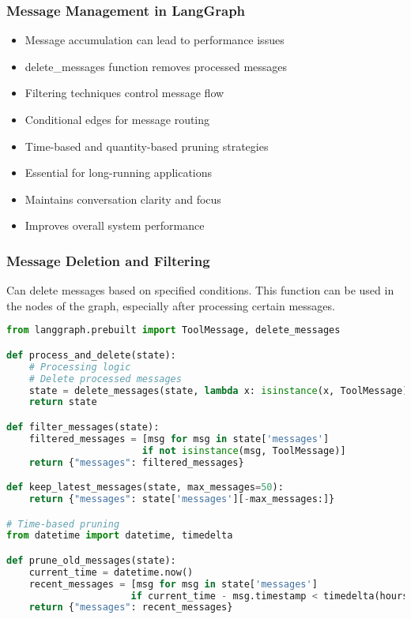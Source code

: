 \begin{frame}[fragile]\frametitle{Message Management in LangGraph}
      \begin{itemize}
        \item Message accumulation can lead to performance issues
        \item delete\_messages function removes processed messages
        \item Filtering techniques control message flow
        \item Conditional edges for message routing
        \item Time-based and quantity-based pruning strategies
        \item Essential for long-running applications
        \item Maintains conversation clarity and focus
        \item Improves overall system performance
      \end{itemize}
\end{frame}

\begin{frame}[fragile]\frametitle{Message Deletion and Filtering}

Can delete messages based on specified conditions. This function can be used in the nodes of the graph, especially after processing certain messages.

      \begin{lstlisting}[language=Python, basicstyle=\tiny]
from langgraph.prebuilt import ToolMessage, delete_messages

def process_and_delete(state):
    # Processing logic
    # Delete processed messages
    state = delete_messages(state, lambda x: isinstance(x, ToolMessage))
    return state

def filter_messages(state):
    filtered_messages = [msg for msg in state['messages'] 
                        if not isinstance(msg, ToolMessage)]
    return {"messages": filtered_messages}

def keep_latest_messages(state, max_messages=50):
    return {"messages": state['messages'][-max_messages:]}

# Time-based pruning
from datetime import datetime, timedelta

def prune_old_messages(state):
    current_time = datetime.now()
    recent_messages = [msg for msg in state['messages'] 
                      if current_time - msg.timestamp < timedelta(hours=1)]
    return {"messages": recent_messages}
      \end{lstlisting}
\end{frame}

